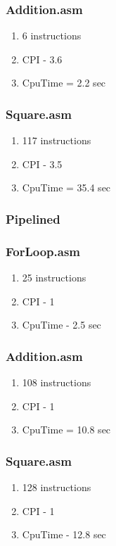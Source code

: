 \documentclass[10pt]{article}
\begin{document}
		\subsubsection{Addition.asm}
		\begin{enumerate}
			\item 6 instructions
			\item CPI - 3.6
			\item CpuTime = 2.2 sec

		\end{enumerate}
		\subsubsection{Square.asm}
		\begin{enumerate}
			\item 117 instructions
			\item CPI - 3.5
			\item CpuTime = 35.4 sec
			
		\end{enumerate}

	\subsubsection{Pipelined}
		\subsubsection{ForLoop.asm}
		\begin{enumerate}
			\item 25 instructions
			\item CPI - 1
			\item CpuTime - 2.5 sec

		\end{enumerate}
		\subsubsection{Addition.asm}
		\begin{enumerate}
			\item 108 instructions
			\item CPI - 1
			\item CpuTime = 10.8 sec
			
		\end{enumerate}
		\subsubsection{Square.asm}
		\begin{enumerate}
			\item 128 instructions
			\item CPI - 1
			\item CpuTime - 12.8 sec
			
		\end{enumerate}
\end{document}
